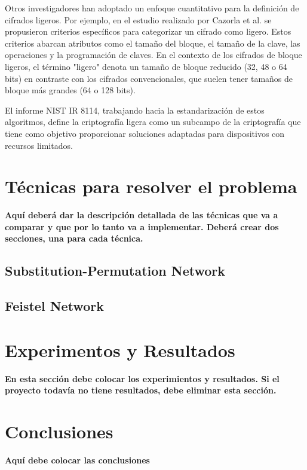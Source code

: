 \documentclass[conference]{IEEEtran}
\begin{document}
Otros investigadores han adoptado un enfoque cuantitativo para la definición de cifrados ligeros. Por ejemplo, en el estudio realizado por Cazorla et al.\cite{cazorla2013survey} se propusieron criterios específicos para categorizar un cifrado como ligero. Estos criterios abarcan atributos como el tamaño del bloque, el tamaño de la clave, las operaciones y la programación de claves. En el contexto de los cifrados de bloque ligeros, el término "ligero" denota un tamaño de bloque reducido (32, 48 o 64 bits) en contraste con los cifrados convencionales, que suelen tener tamaños de bloque más grandes (64 o 128 bits).

El informe NIST IR 8114\cite{NIST}, trabajando hacia la estandarización de estos algoritmos, define la criptografía ligera como un subcampo de la criptografía que tiene como objetivo proporcionar soluciones adaptadas para dispositivos con recursos limitados.


\section{Técnicas para resolver el problema}
\textbf{Aquí deberá dar la descripción detallada de las técnicas que va a comparar y que por lo tanto va a implementar. Deberá crear dos secciones, una para cada técnica.}
\subsection{Substitution-Permutation Network}
\subsection{Feistel Network}
\section{Experimentos y Resultados}
\textbf{En esta sección debe colocar los experimientos y resultados. Si el proyecto todavía no tiene resultados, debe eliminar esta sección.}

\section{Conclusiones}
\textbf{Aquí debe colocar las conclusiones}



\vspace{12pt}
\end{document}
